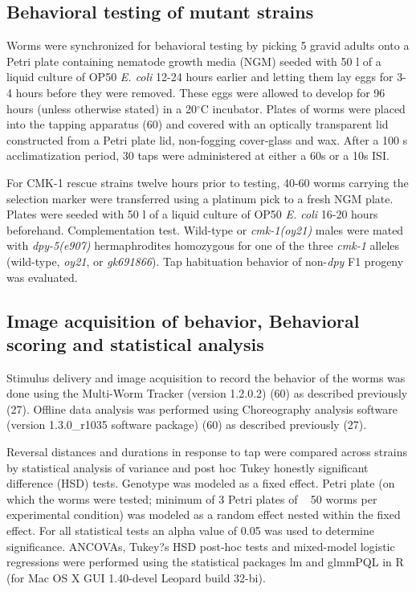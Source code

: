 \documentclass[9pt,twocolumn,twoside]{gsajnl}
\begin{document}
\subsection{Behavioral testing of mutant strains}

Worms were synchronized for behavioral testing by picking 5 gravid adults onto a Petri plate containing nematode growth media (NGM) seeded with 50 l of a liquid culture of OP50 \textit{E. coli} 12-24 hours earlier and letting them lay eggs for 3-4 hours before they were removed.  These eggs were allowed to develop for 96 hours (unless otherwise stated) in a 20$^{\circ}$C incubator. Plates of worms were placed into the tapping apparatus (60) and covered with an optically transparent lid constructed from a Petri plate lid, non-fogging cover-glass and wax.  After a 100 s acclimatization period, 30 taps were administered at either a 60s or a 10s ISI.

For CMK-1 rescue strains twelve hours prior to testing, 40-60 worms carrying the selection marker were transferred using a platinum pick to a fresh NGM plate. Plates were seeded with 50 l of a liquid culture of OP50 \textit{E. coli} 16-20 hours beforehand. Complementation test. Wild-type or \textit{cmk-1(oy21)} males were mated with \textit{dpy-5(e907)} hermaphrodites homozygous for one of the three \textit{cmk-1} alleles (wild-type, \textit{oy21}, or \textit{gk691866}). Tap habituation behavior of non-\textit{dpy} F1 progeny was evaluated.

\subsection{Image acquisition of behavior, Behavioral scoring and statistical analysis}

Stimulus delivery and image acquisition to record the behavior of the worms was done using the Multi-Worm Tracker (version 1.2.0.2) (60) as described previously (27).  Offline data analysis was performed using Choreography analysis software (version 1.3.0\_r1035 software package) (60) as described previously (27).

	Reversal distances and durations in response to tap were compared across strains by statistical analysis of variance and post hoc Tukey honestly significant difference (HSD) tests. Genotype was modeled as a fixed effect. Petri plate (on which the worms were tested; minimum of 3 Petri plates of ~ 50 worms per experimental condition) was modeled as a random effect nested within the fixed effect. For all statistical tests an alpha value of 0.05 was used to determine significance. ANCOVAs, Tukey?s HSD post-hoc tests and mixed-model logistic regressions were performed using the statistical packages lm and glmmPQL in R (for Mac OS X GUI 1.40-devel Leopard build 32-bi).
\end{document}
